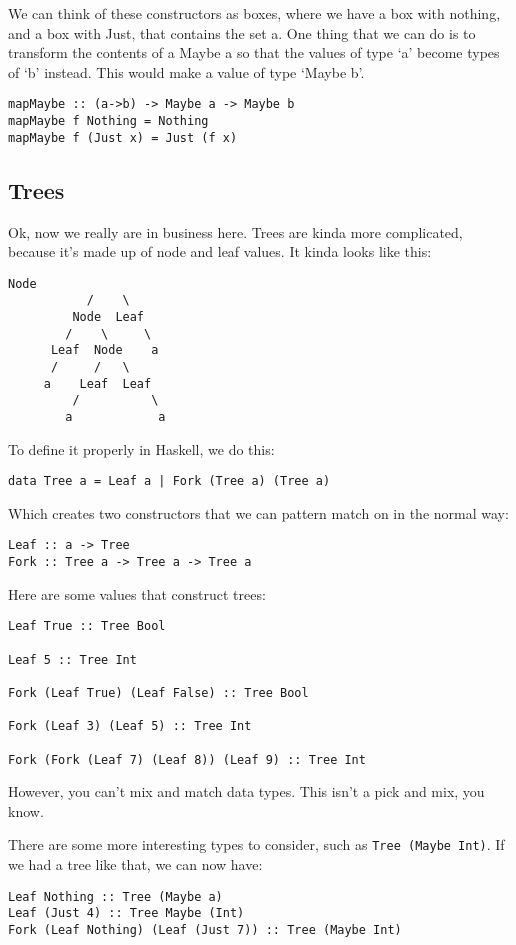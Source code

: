 \documentclass[11pt,a4paper,titlepage,dvipsnames,cmyk]{scrartcl}
\begin{document}
We can think of these constructors as boxes, where we have a box with
nothing, and a box with Just, that contains the set a. One thing that we
can do is to transform the contents of a Maybe a so that the values of
type `a' become types of `b' instead. This would make a value of type
`Maybe b'.
\begin{lstlisting}[style=B]
mapMaybe :: (a->b) -> Maybe a -> Maybe b
mapMaybe f Nothing = Nothing
mapMaybe f (Just x) = Just (f x)
\end{lstlisting}

\subsection{Trees}%
\label{sub:Trees}
Ok, now we really are in business here. Trees are kinda more complicated,
because it's made up of node and leaf values. It kinda looks like this:
\begin{lstlisting}[style=B]
            Node
           /    \
         Node  Leaf
        /    \     \
      Leaf  Node    a
      /     /   \
     a    Leaf  Leaf
         /          \
        a            a
\end{lstlisting}

To define it properly in Haskell, we do this:
\begin{lstlisting}[style=B]
data Tree a = Leaf a | Fork (Tree a) (Tree a)
\end{lstlisting}

Which creates two constructors that we can pattern match on in the normal
way:
\begin{lstlisting}[style=B]
Leaf :: a -> Tree
Fork :: Tree a -> Tree a -> Tree a
\end{lstlisting}

Here are some values that construct trees:
\begin{lstlisting}[style=B]
Leaf True :: Tree Bool

Leaf 5 :: Tree Int

Fork (Leaf True) (Leaf False) :: Tree Bool

Fork (Leaf 3) (Leaf 5) :: Tree Int

Fork (Fork (Leaf 7) (Leaf 8)) (Leaf 9) :: Tree Int
\end{lstlisting}

However, you can't mix and match data types. This isn't a pick and mix,
you know.

There are some more interesting types to consider, such as \lstinline|Tree (Maybe Int)|.
If we had a tree like that, we can now have:
\begin{lstlisting}[style=B]
Leaf Nothing :: Tree (Maybe a)
Leaf (Just 4) :: Tree Maybe (Int)
Fork (Leaf Nothing) (Leaf (Just 7)) :: Tree (Maybe Int)
\end{lstlisting}
\end{document}
